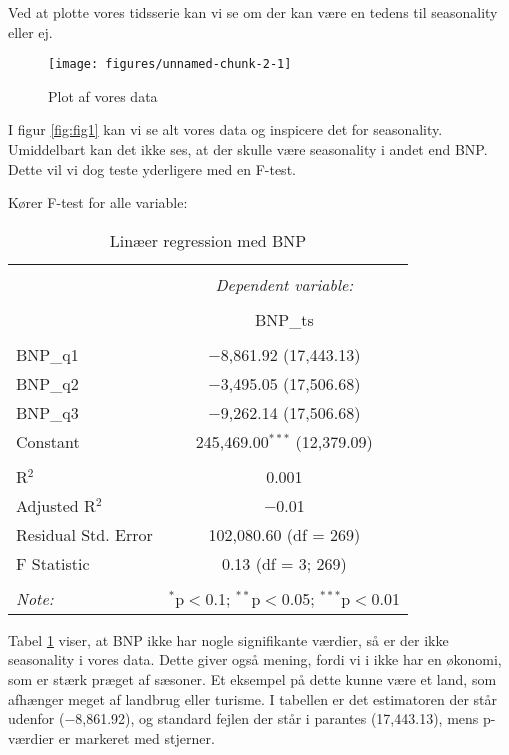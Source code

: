 \documentclass[
  10pt,
]{article}
\begin{document}
Ved at plotte vores tidsserie kan vi se om der kan være en tedens til
seasonality eller ej.\\

\begin{figure}[H]

{\centering \texttt{[image: figures/unnamed-chunk-2-1]} 

}

\caption{\label{fig:fig1}Plot af vores data}\label{fig:unnamed-chunk-2}
\end{figure}

I figur \ref{fig:fig1} kan vi se alt vores data og inspicere det for
seasonality. Umiddelbart kan det ikke ses, at der skulle være
seasonality i andet end BNP. Dette vil vi dog teste yderligere med en
F-test.

Kører F-test for alle variable:

\begin{table}[!htbp] \centering 
  \caption{Linæer regression med BNP} 
  \label{tab:tabel1} 
\begin{tabular}{@{\extracolsep{5pt}}lc} 
\\[-1.8ex]\hline 
\hline \\[-1.8ex] 
 & \multicolumn{1}{c}{\textit{Dependent variable:}} \\ 
\cline{2-2} 
\\[-1.8ex] & BNP\_ts \\ 
\hline \\[-1.8ex] 
 BNP\_q1 & $-$8,861.92 (17,443.13) \\ 
  BNP\_q2 & $-$3,495.05 (17,506.68) \\ 
  BNP\_q3 & $-$9,262.14 (17,506.68) \\ 
  Constant & 245,469.00$^{***}$ (12,379.09) \\ 
 \hline \\[-1.8ex] 
R$^{2}$ & 0.001 \\ 
Adjusted R$^{2}$ & $-$0.01 \\ 
Residual Std. Error & 102,080.60 (df = 269) \\ 
F Statistic & 0.13 (df = 3; 269) \\ 
\hline 
\hline \\[-1.8ex] 
\textit{Note:}  & \multicolumn{1}{r}{$^{*}$p$<$0.1; $^{**}$p$<$0.05; $^{***}$p$<$0.01} \\ 
\end{tabular} 
\end{table}

Tabel \ref{tab:tabel1} viser, at BNP ikke har nogle signifikante
værdier, så er der ikke seasonality i vores data. Dette giver også
mening, fordi vi i ikke har en økonomi, som er stærk præget af sæsoner.
Et eksempel på dette kunne være et land, som afhænger meget af landbrug
eller turisme. I tabellen er det estimatoren der står udenfor
(−8,861.92), og standard fejlen der står i parantes (17,443.13), mens
p-værdier er markeret med stjerner. \newpage
\end{document}
